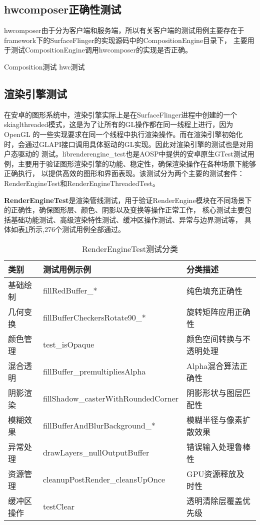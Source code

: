 \subsection{hwcomposer正确性测试}
\label{sec:hwcomposer测试}
hwcomposer由于分为客户端和服务端，所以有关客户端的测试用例主要存在于framework下的SurfaceFlinger的实现源码中的CompositionEngine目录下，
主要用于测试CompositionEngine调用hwcomposer的实现是否正确。

Composition测试
hwc测试

\subsection{渲染引擎测试}
\label{sec:渲染引擎测试}
在安卓的图形系统中，渲染引擎实际上是在SurfaceFlinger进程中创建的一个skiaglthreaded模式，这是为了让所有的GL操作都在同一线程上进行，因为
OpenGL 的一些实现要求在同一个线程中执行渲染操作。而在渲染引擎初始化时，会通过GLAPI接口调用具体驱动的GL实现。因此对渲染引擎的测试也是对用户态驱动的
测试。librenderengine\_test也是AOSP中提供的安卓原生GTest测试用例，主要用于验证图形渲染引擎的功能、稳定性，确保渲染操作在各种场景下能够正确执行，
以提供高效的图形和界面表现。该测试分为两个主要的测试套件：RenderEngineTest和RenderEngineThreadedTest。

\textbf{RenderEngineTest}是渲染管线测试，用于验证RenderEngine模块在不同场景下的正确性，确保图形层、颜色、阴影以及变换等操作正常工作，
核心测试主要包括基础功能测试、高级渲染特性测试、缓冲区操作测试、异常与边界测试等，
具体如表\ref{tab:RenderEngineTest测试分类}所示,276个测试用例全部通过。
    \begin{table}[h]
        \centering
        \caption{RenderEngineTest测试分类}
        \label{tab:RenderEngineTest测试分类}
        \begin{tabular}{lll}
          \toprule
          类别 & 测试用例示例 & 分类描述 \\
          \midrule
            基础绘制 & fillRedBuffer\_* & 纯色填充正确性 \\
            几何变换 & fillBufferCheckersRotate90\_* & 旋转矩阵应用正确性 \\
            颜色管理 & test\_isOpaque & 颜色空间转换与不透明处理 \\
            混合透明 & fillBuffer\_premultipliesAlpha & Alpha混合算法正确性 \\
            阴影渲染 & fillShadow\_casterWithRoundedCorner & 阴影形状与图层匹配性 \\
            模糊效果 & fillBufferAndBlurBackground\_* & 模糊半径与像素扩散效果 \\
            异常处理 & drawLayers\_nullOutputBuffer & 错误输入处理鲁棒性 \\
            资源管理 & cleanupPostRender\_cleansUpOnce & GPU资源释放及时性 \\
            缓冲区操作 & testClear & 透明清除层覆盖优先级 \\
          \bottomrule
        \end{tabular}
        \note{}
    \end{table}

